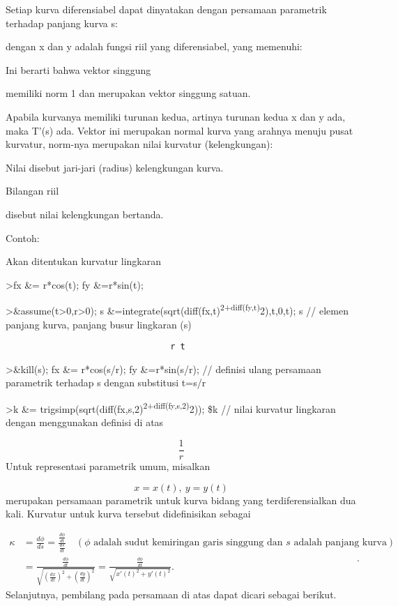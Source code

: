 \documentclass[
]{book}
\begin{document}
Setiap kurva diferensiabel dapat dinyatakan dengan persamaan parametrik terhadap panjang kurva s:

dengan x dan y adalah fungsi riil yang diferensiabel, yang memenuhi:

Ini berarti bahwa vektor singgung

memiliki norm 1 dan merupakan vektor singgung satuan.

Apabila kurvanya memiliki turunan kedua, artinya turunan kedua x dan y ada, maka T'(s) ada. Vektor ini merupakan normal kurva yang arahnya menuju pusat kurvatur, norm-nya merupakan nilai kurvatur (kelengkungan):

Nilai disebut jari-jari (radius) kelengkungan kurva.

Bilangan riil

disebut nilai kelengkungan bertanda.

Contoh:

Akan ditentukan kurvatur lingkaran

\textgreater fx \&= r*cos(t); fy \&=r*sin(t);

\textgreater\&assume(t\textgreater0,r\textgreater0); s \&=integrate(sqrt(diff(fx,t)\textsuperscript{2+diff(fy,t)}2),t,0,t); s // elemen panjang kurva, panjang busur lingkaran (s)

\begin{verbatim}
                                 r t
\end{verbatim}

\textgreater\&kill(s); fx \&= r*cos(s/r); fy \&=r*sin(s/r); // definisi ulang persamaan parametrik terhadap s dengan substitusi t=s/r

\textgreater k \&= trigsimp(sqrt(diff(fx,s,2)\textsuperscript{2+diff(fy,s,2)}2)); \$k // nilai kurvatur lingkaran dengan menggunakan definisi di atas

\[\frac{1}{r}\]Untuk representasi parametrik umum, misalkan

\[x = x(t),\ y= y(t)\]merupakan persamaan parametrik untuk kurva bidang yang terdiferensialkan dua kali. Kurvatur untuk kurva tersebut didefinisikan sebagai

\[\begin{aligned}\kappa &= \frac{d\phi}{ds}=\frac{\frac{d\phi}{dt}}{\frac{ds}{dt}}\quad (\phi \text{ adalah sudut kemiringan garis singgung dan }s \text{ adalah panjang kurva})\\ &=\frac{\frac{d\phi}{dt}}{\sqrt{(\frac{dx}{dt})^2+(\frac{dy}{dt})^2}}= \frac{\frac{d\phi}{dt}}{\sqrt{x'(t)^2+y'(t)^2}}.\end{aligned}.\]Selanjutnya, pembilang pada persamaan di atas dapat dicari sebagai berikut.
\end{document}

